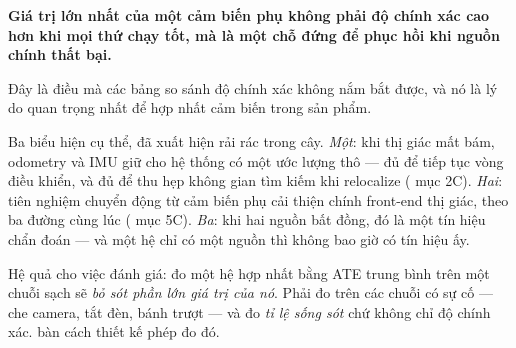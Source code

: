 \documentclass[../../vslam.tex]{subfiles}
\begin{document}
\begin{cannho}
\textbf{Giá trị lớn nhất của một cảm biến phụ không phải độ chính xác cao hơn khi mọi thứ chạy tốt, mà là một chỗ đứng để phục hồi khi nguồn chính thất bại.}

Đây là điều mà các bảng so sánh độ chính xác không nắm bắt được, và nó là lý do quan trọng nhất để hợp nhất cảm biến trong sản phẩm.

Ba biểu hiện cụ thể, đã xuất hiện rải rác trong cây. \emph{Một}: khi thị giác mất bám, odometry và IMU giữ cho hệ thống có một ước lượng thô --- đủ để tiếp tục vòng điều khiển, và đủ để thu hẹp không gian tìm kiếm khi relocalize ( mục 2C). \emph{Hai}: tiên nghiệm chuyển động từ cảm biến phụ cải thiện chính front-end thị giác, theo ba đường cùng lúc ( mục 5C). \emph{Ba}: khi hai nguồn bất đồng, đó là một tín hiệu chẩn đoán --- và một hệ chỉ có một nguồn thì không bao giờ có tín hiệu ấy.

Hệ quả cho việc đánh giá: đo một hệ hợp nhất bằng ATE trung bình trên một chuỗi sạch sẽ \emph{bỏ sót phần lớn giá trị của nó}. Phải đo trên các chuỗi có sự cố --- che camera, tắt đèn, bánh trượt --- và đo \emph{tỉ lệ sống sót} chứ không chỉ độ chính xác.  bàn cách thiết kế phép đo đó.
\end{cannho}

\begin{ungdung}
\end{ungdung}
\end{document}
